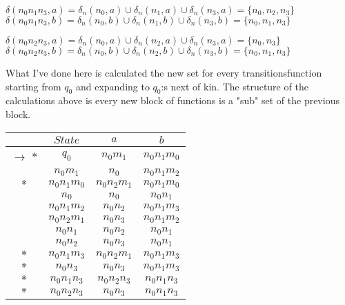 \documentclass{article}
\begin{document}
$\delta (n_0n_1n_3, a) = \delta_n (n_0,a) \cup \delta_n (n_1,a) \cup \delta_n (n_3,a) = 
\{n_0, n_2, n_3\}$ \newline
$\delta (n_0n_1n_3, b) = \delta_n (n_0,b) \cup \delta_n (n_1,b) \cup \delta_n (n_3,b) = 
\{n_0, n_1, n_3\}$ 

$\delta (n_0n_2n_3, a) = \delta_n (n_0,a) \cup \delta_n (n_2,a) \cup \delta_n (n_3,a) = 
\{n_0, n_3\}$ \newline
$\delta (n_0n_2n_3, b) = \delta_n (n_0,b) \cup \delta_n (n_2,b) \cup \delta_n (n_3,b) = 
\{n_0, n_1, n_3\}$

What I've done here is calculated the new set for every transitionsfunction starting from 
$q_0$ and expanding to $q_0$:s next of kin. The structure of the calculations above is 
every new block of functions is a "sub" set of the previous block.

\begin{table}[ht!]
  \huge
  \centering
 \begin{tabular}{||c c c c||} 
 \hline
 & $State$ & $a$ & $b$ \\ [0.5ex] 
 \hline\hline
 $\rightarrow$ $*$    & $q_0$ & $n_0m_1$ & $n_0n_1m_0$ \\ 
    \hfill            & $n_0m_1$ & $n_0$ & $n_0n_1m_2$ \\
    \hfill $*$        & $n_0n_1m_0$ & $n_0n_2m_1$ & $n_0n_1m_0$ \\
    \hfill            & $n_0$ & $n_0$ & $n_0n_1$\\
    \hfill            & $n_0n_1m_2$ & $n_0n_2$ & $n_0n_1m_3$ \\
    \hfill            & $n_0n_2m_1$ & $n_0n_3$ & $n_0n_1m_2$ \\
    \hfill            & $n_0n_1$ & $n_0n_2$ & $n_0n_1$ \\
    \hfill            & $n_0n_2$ & $n_0n_3$ & $n_0n_1$ \\
    \hfill $*$        & $n_0n_1m_3$ & $n_0n_2m_1$ & $n_0n_1m_3$ \\
    \hfill $*$        & $n_0n_3$ & $n_0n_3$ & $n_0n_1m_3$ \\
    \hfill $*$        & $n_0n_1n_3$ & $n_0n_2n_3$ & $n_0n_1n_3$ \\
    \hfill $*$        & $n_0n_2n_3$ & $n_0n_3$ & $n_0n_1n_3$ \\ [1ex]
 \hline
 \end{tabular}
\end{table}
\end{document}
